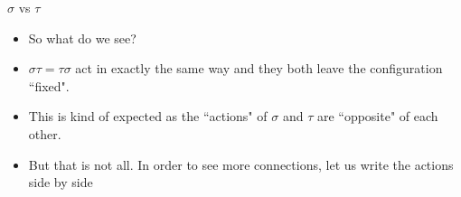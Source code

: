 \documentclass[ %
 10pt, xcolor={dvipsnames,svgnames,x11names,hyperref},
   hyperref={colorlinks=true,citecolor=green,linkcolor=DarkRed,urlcolor=ProcessBlue,anchorcolor=blue}
  ]{beamer}
\newenvironment{stepitemize}{\begin{itemize}[<+->]}{\end{itemize} }
\begin{document}
\begin{frame}{$\sigma$ vs $\tau$}
\begin{stepitemize}
\begin{center}
\end{center}

\bigskip

\item So what do we see?
\item $\sigma\tau = \tau\sigma$ act in exactly the same way and they both leave the configuration ``fixed".
\item This is kind of expected as the ``actions" of $\sigma$ and $\tau$ are ``opposite" of each other.
\item But that is not all. In order to see more connections, let us write the actions side by side
\end{stepitemize}
\end{frame}
\end{document}
